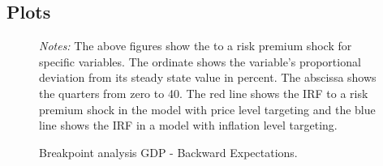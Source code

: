 \documentclass[11pt, a4paper, leqno]{article}
\begin{document}
\subsection{Plots}

\begin{figure}[ht!]
	\caption{Breakpoint analysis GDP - Backward Expectations.}
	\label{fig:irf}
	\centering
    	\bigskip
	\begin{minipage}{\textwidth}%
		\footnotesize\setlength{\baselineskip}{11pt}%
		\bigskip \textit{Notes:} The above figures show the  to a risk premium shock for specific variables. The ordinate shows the variable's proportional deviation from its steady state value in percent. The abscissa shows the quarters from zero to 40. The red line shows the IRF to a risk premium shock in the model with price level targeting and the blue line shows the IRF in a model with inflation level targeting.
	\end{minipage}
\end{figure}
\end{document}
